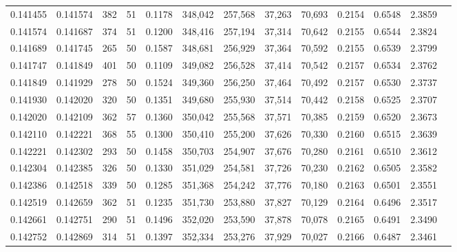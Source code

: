 \begin{tabular}{rrrrrrrrrrrrr}
0.141455 & 0.141574 &   382 &  51 &                                     0.1178 & 348,042 & 257,568 &  37,263 &  70,693 & 0.2154 & 0.6548 & 2.3859 \\
0.141574 & 0.141687 &   374 &  51 &                                     0.1200 & 348,416 & 257,194 &  37,314 &  70,642 & 0.2155 & 0.6544 & 2.3824 \\
0.141689 & 0.141745 &   265 &  50 &                                     0.1587 & 348,681 & 256,929 &  37,364 &  70,592 & 0.2155 & 0.6539 & 2.3799 \\
0.141747 & 0.141849 &   401 &  50 &                                     0.1109 & 349,082 & 256,528 &  37,414 &  70,542 & 0.2157 & 0.6534 & 2.3762 \\
0.141849 & 0.141929 &   278 &  50 &                                     0.1524 & 349,360 & 256,250 &  37,464 &  70,492 & 0.2157 & 0.6530 & 2.3737 \\
0.141930 & 0.142020 &   320 &  50 &                                     0.1351 & 349,680 & 255,930 &  37,514 &  70,442 & 0.2158 & 0.6525 & 2.3707 \\
0.142020 & 0.142109 &   362 &  57 &                                     0.1360 & 350,042 & 255,568 &  37,571 &  70,385 & 0.2159 & 0.6520 & 2.3673 \\
0.142110 & 0.142221 &   368 &  55 &                                     0.1300 & 350,410 & 255,200 &  37,626 &  70,330 & 0.2160 & 0.6515 & 2.3639 \\
0.142221 & 0.142302 &   293 &  50 &                                     0.1458 & 350,703 & 254,907 &  37,676 &  70,280 & 0.2161 & 0.6510 & 2.3612 \\
0.142304 & 0.142385 &   326 &  50 &                                     0.1330 & 351,029 & 254,581 &  37,726 &  70,230 & 0.2162 & 0.6505 & 2.3582 \\
0.142386 & 0.142518 &   339 &  50 &                                     0.1285 & 351,368 & 254,242 &  37,776 &  70,180 & 0.2163 & 0.6501 & 2.3551 \\
0.142519 & 0.142659 &   362 &  51 &                                     0.1235 & 351,730 & 253,880 &  37,827 &  70,129 & 0.2164 & 0.6496 & 2.3517 \\
0.142661 & 0.142751 &   290 &  51 &                                     0.1496 & 352,020 & 253,590 &  37,878 &  70,078 & 0.2165 & 0.6491 & 2.3490 \\
0.142752 & 0.142869 &   314 &  51 &                                     0.1397 & 352,334 & 253,276 &  37,929 &  70,027 & 0.2166 & 0.6487 & 2.3461 \\

\end{tabular}
